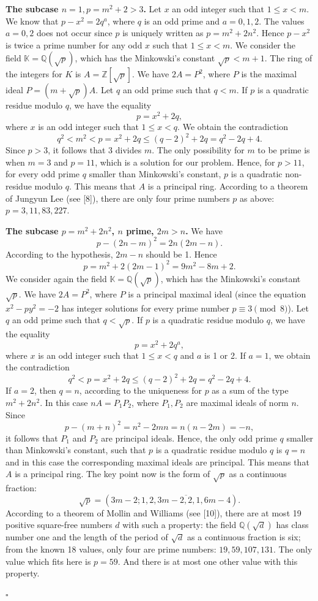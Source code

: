 \documentclass[12pt]{article}
\newenvironment{proof}{{\it Proof.}}{\hfill $ \square $ \vskip 4mm}
\begin{document}
{\begin{proof}
{\bf The subcase $n=1, p=m^2+2>3$.} Let $x$ an odd integer such that $1\leq x <m$. We know that $p-x^2=2q^a$, where $q$ is an odd prime and $a=0,1,2$. The values $a=0,2$ does not occur since $p$ is uniquely written as $p=m^2+2n^2$. Hence $p-x^2$ is twice a prime number  for any odd $x$ such that $1\leq x<m$. We consider the field $\mathbb{K}=\mathbb{Q}(\sqrt {p})$, which has the Minkowski's constant $\sqrt p<m+1$. The ring of the integers for $K$ is $A=\mathbb{Z}[\sqrt {p}]$. 
We have $2A=P^2$, where $P$ is the maximal ideal $P=(m+\sqrt p)A$. Let $q$ an odd prime such that $q< m$. If $p$ is a quadratic residue modulo $q$, we have the equality
$$p=x^2+2q,$$ where $x$ is an odd integer such that $1\leq x<q$. We obtain the contradiction
$$q^2<m^2<p=x^2+2q\leq (q-2)^2+2q=q^2-2q+4.$$
Since $p>3$, it follows that 3 divides $m$. The only possibility for $m$ to be prime is when $m=3$ and $p=11$, which is a solution for our problem. Hence, for $p>11$, for every odd prime $q$ smaller than Minkowski's constant, $p$ is a quadratic non-residue modulo $q$. This means that $A$ is a principal ring. According to a theorem of Jungyun Lee (see [8]), there are only four prime numbers $p$ as above: $p=3,11,83,227$.

{\bf The subcase $p=m^2+2n^2$, $n$ prime, $2m>n$.} We have
$$p-(2n-m)^2=2n(2m-n).$$ According to the hypothesis, $2m-n$ should be 1. Hence 
$$p=m^2+2(2m-1)^2=9m^2-8m+2.$$
We consider again the field $\mathbb{K}=\mathbb{Q}(\sqrt {p})$, which has the Minkowski's constant $\sqrt p$.
We have $2A=P^2$, where $P$ is a principal maximal ideal (since the equation $x^2-py^2=-2$ has integer solutions for every prime number $p\equiv 3 \pmod 8$). Let $q$ an odd prime such that $q< \sqrt p$. If $p$ is a quadratic residue modulo $q$, we have the equality
$$p=x^2+2q^a,$$ where $x$ is an odd integer such that $1\leq x<q$ and $a$ is 1 or 2. If $a=1$, we obtain the contradiction
$$q^2<p=x^2+2q\leq (q-2)^2+2q=q^2-2q+4.$$ If $a=2$, then $q=n$, according to the uniqueness for $p$ as a sum of the type $m^2+2n^2$. In this case $nA=P_1P_2$, where $P_1,P_2$ are maximal ideals of norm $n$. Since 
$$p-(m+n)^2=n^2-2mn=n(n-2m)=-n,$$ it follows that $P_1$ and $P_2$ are principal ideals.
Hence, the only odd prime $q$ smaller than Minkowski's constant, such that $p$ is a quadratic residue modulo $q$ is $q=n$ and in this case the corresponding maximal ideals are principal. This means that $A$ is a principal ring. The key point now is the form of $\sqrt p$ as a continuous fraction:
$$\sqrt p = (3m-2; \overline {1,2,3m-2,2,1,6m-4}).$$
According to a theorem of Mollin and Williams (see [10]), there are at most 19 positive square-free numbers $d$ with such a property: the field $\mathbb{Q}(\sqrt d)$ has class number one and the length of the period of $\sqrt d$ as a continuous fraction is six; from the known 18 values, only four are prime numbers: $19, 59,107,131$. The only value which fits here is $p=59$. And there is at most one other value with this property. 


\end{proof}}
\end{document}

